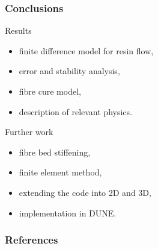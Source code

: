 \documentclass[compress]{beamer}%
\newenvironment{myalign}
{\align\color{\notcolor}}
{
  \nonumber
  \endalign
  \vspace{-1em}
}
\begin{document}
\begin{frame}
  \frametitle{Conclusions}
  Results
  \begin{itemize}
  \item finite difference model for resin flow,
  \item error and stability analysis,
  \item fibre cure model,
  \item description of relevant physics.
  \end{itemize}

  Further work
  \begin{itemize}
  \item fibre bed stiffening,
  \item finite element method,
  \item extending the code into 2D and 3D,
  \item implementation in DUNE.
  \end{itemize}
\end{frame}


  
  


\begin{frame}
  \frametitle{References}
  
\end{frame}
\end{document}
